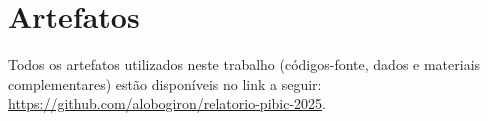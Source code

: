 \documentclass[a4paper,11pt]{article}
\begin{document}


\newpage
\begin{abstract}

\end{abstract}

\newpage
\tableofcontents

%


%
%
%
%

\section*{Artefatos}
Todos os artefatos utilizados neste trabalho (códigos-fonte, dados e materiais complementares) estão disponíveis no link a seguir: \url{https://github.com/alobogiron/relatorio-pibic-2025}.

\renewcommand\refname{Referências Bibliográficas}
%


\end{document}

